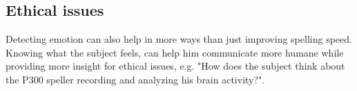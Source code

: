 \subsection{Ethical issues}

Detecting emotion can also help in more ways than just improving spelling speed. Knowing what the subject feels, can help him communicate more humane while providing more insight for ethical issues, e.g. "How does the subject think about the P300 speller recording and analyzing his brain activity?".
